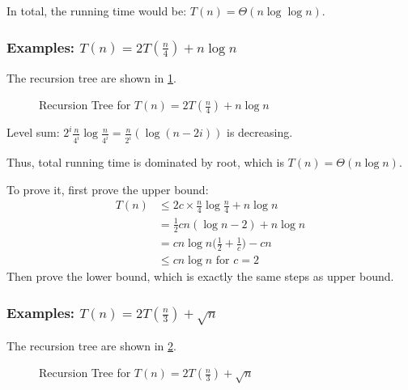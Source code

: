 In total, the running time would be: $T(n) = \Theta(n\log\log n)$.


\subsubsection{Examples: \texorpdfstring{$T(n)=2T(\frac{n}{4}) + n\log n$}{T(n)=2T(n/4) + n log n}}
The recursion tree are shown in \cref{fig:rt2}.
\begin{figure}[H]
    \caption{Recursion Tree for \texorpdfstring{$T(n)=2T(\frac{n}{4}) + n\log n$}{T(n)=2T(n/4) + n log n}}
    \label{fig:rt2}
    \centering
\end{figure}

Level sum: $\displaystyle 2^i \frac{n}{4^i} \log\frac{n}{4^i} = \frac{n}{2^i}(\log (n-2i))$
is decreasing.

Thus, total running time is dominated by root, which is $T(n) = \Theta(n \log n)$.

To prove it, first prove the upper bound:
\begin{align*}
    T(n) &\leq 2c \times \frac{n}{4}\log\frac{n}{4} + n \log n \\
         &= \frac{1}{2}cn(\log n-2)+n \log n\\
         &= cn\log n \bigg(\frac{1}{2}+\frac{1}{c}\bigg) - cn \\
         &\leq cn\log n \text{ for } c = 2
\end{align*}
Then prove the lower bound, which is exactly the same steps as upper bound.


\subsubsection{Examples: \texorpdfstring{$T(n)=2T(\frac{n}{3}) + \sqrt{n}$}{T(n)=2T(n/3) + sqrt(n)}}
The recursion tree are shown in \cref{fig:rt3}.
\begin{figure}[H]
    \caption{Recursion Tree for \texorpdfstring{$T(n)=2T(\frac{n}{3}) + \sqrt{n}$}{T(n)=2T(n/3) + sqrt(n)}}
    \label{fig:rt3}
    \centering
{}
\end{figure}

